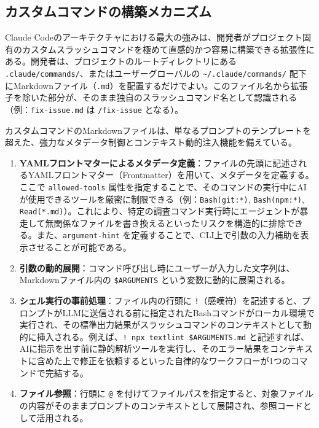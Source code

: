 \documentclass[a4paper,11pt]{ltjsarticle}
\newcommand{\cmd}[1]{\texttt{#1}}
\newcommand{\home}{\textasciitilde}
\begin{document}
\subsection{カスタムコマンドの構築メカニズム}

Claude Codeのアーキテクチャにおける最大の強みは、開発者がプロジェクト固有のカスタムスラッシュコマンドを極めて直感的かつ容易に構築できる拡張性にある。開発者は、プロジェクトのルートディレクトリにある \cmd{.claude/commands/}、またはユーザーグローバルの \cmd{\home/.claude/commands/} 配下にMarkdownファイル（\cmd{.md}）を配置するだけでよい。このファイル名から拡張子を除いた部分が、そのまま独自のスラッシュコマンド名として認識される（例：\cmd{fix-issue.md} は \cmd{/fix-issue} となる）\cite{r6}。

カスタムコマンドのMarkdownファイルは、単なるプロンプトのテンプレートを超えた、強力なメタデータ制御とコンテキスト動的注入機能を備えている。

\begin{enumerate}[label=(\arabic*)]
\item \textbf{YAMLフロントマターによるメタデータ定義}：ファイルの先頭に記述されるYAMLフロントマター（Frontmatter）を用いて、メタデータを定義する。ここで \cmd{allowed-tools} 属性を指定することで、そのコマンドの実行中にAIが使用できるツールを厳密に制限できる（例：\cmd{Bash(git:*)}, \cmd{Bash(npm:*)}, \cmd{Read(*.md)}）\cite{r7}。これにより、特定の調査コマンド実行時にエージェントが暴走して無関係なファイルを書き換えるといったリスクを構造的に排除できる\cite{r7}。また、\cmd{argument-hint} を定義することで、CLI上で引数の入力補助を表示させることが可能である\cite{r9}。
\item \textbf{引数の動的展開}：コマンド呼び出し時にユーザーが入力した文字列は、Markdownファイル内の \cmd{\$ARGUMENTS} という変数に動的に展開される\cite{r6}。
\item \textbf{シェル実行の事前処理}：ファイル内の行頭に \cmd{!}（感嘆符）を記述すると、プロンプトがLLMに送信される前に指定されたBashコマンドがローカル環境で実行され、その標準出力結果がスラッシュコマンドのコンテキストとして動的に挿入される\cite{r7}。例えば、\cmd{!~npx textlint \$ARGUMENTS.md} と記述すれば、AIに指示を出す前に静的解析ツールを実行し、そのエラー結果をコンテキストに含めた上で修正を依頼するといった自律的なワークフローが1つのコマンドで完結する\cite{r7}。
\item \textbf{ファイル参照}：行頭に \cmd{@} を付けてファイルパスを指定すると、対象ファイルの内容がそのままプロンプトのコンテキストとして展開され、参照コードとして活用される\cite{r7}。
\end{enumerate}
\end{document}
